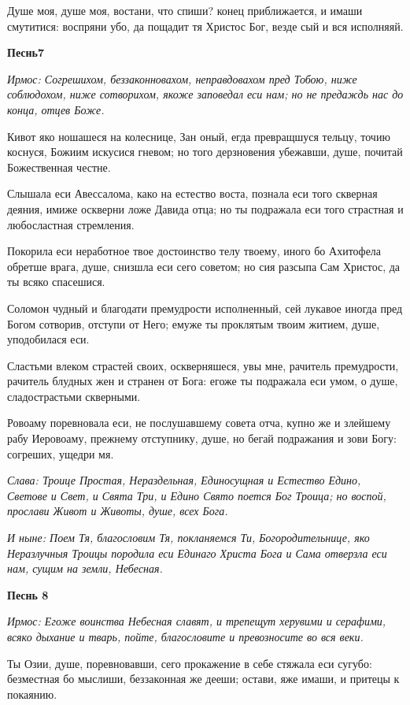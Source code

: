 Душе моя, душе моя, востани, что спиши? конец приближается, и имаши смутитися: воспряни убо, да пощадит тя Христос Бог, везде сый и вся исполняяй. 

\medskip\bfseries Песнь7\normalfont{}

\itshape Ирмос\normalfont{}: Согрешихом, беззаконновахом, неправдовахом пред Тобою, ниже соблюдохом, ниже сотворихом, якоже заповедал еси нам; но не предаждь нас до конца, отцев Боже. 

Кивот яко ношашеся на колеснице, Зан оный, егда превращшуся тельцу, точию коснуся, Божиим искусися гневом; но того дерзновения убежавши, душе, почитай Божественная честне. 

Слышала еси Авессалома, како на естество воста, познала еси того скверная деяния, имиже оскверни ложе Давида отца; но ты подражала еси того страстная и любосластная стремления. 

Покорила еси неработное твое достоинство телу твоему, иного бо Ахитофела обретше врага, душе, снизшла еси сего советом; но сия разсыпа Сам Христос, да ты всяко спасешися. 

Соломон чудный и благодати премудрости исполненный, сей лукавое иногда пред Богом сотворив, отступи от Него; емуже ты проклятым твоим житием, душе, уподобилася еси. 

Сластьми влеком страстей своих, оскверняшеся, увы мне, рачитель премудрости, рачитель блудных жен и странен от Бога: егоже ты подражала еси умом, о душе, сладострастьми скверными. 

Ровоаму поревновала еси, не послушавшему совета отча, купно же и злейшему рабу Иеровоаму, прежнему отступнику, душе, но бегай подражания и зови Богу: согреших, ущедри мя. 

\itshape Слава\normalfont{}: Троице Простая, Нераздельная, Единосущная и Естество Едино, Светове и Свет, и Свята Три, и Едино Свято поется Бог Троица; но воспой, прослави Живот и Животы, душе, всех Бога. 

\itshape И ныне\normalfont{}: Поем Тя, благословим Тя, покланяемся Ти, Богородительнице, яко Неразлучныя Троицы породила еси Единаго Христа Бога и Сама отверзла еси нам, сущим на земли, Небесная. 

\medskip\bfseries Песнь 8\normalfont{}

\itshape Ирмос\normalfont{}: Егоже воинства Небесная славят, и трепещут херувими и серафими, всяко дыхание и тварь, пойте, благословите и превозносите во вся веки. 

Ты Озии, душе, поревновавши, сего прокажение в себе стяжала еси сугубо: безместная бо мыслиши, беззаконная же дееши; остави, яже имаши, и притецы к покаянию. 

